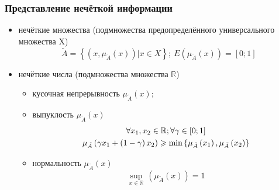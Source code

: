 \documentclass[12pt]{beamer}
\begin{document}

\begin{frame}
  \frametitle{Представление нечёткой информации}
  \begin{itemize}
    \item нечёткие множества (подмножества предопределённого универсального множества X)
      \begin{equation}
      	\tilde{A}=\left\{ \left( x, \mu_{\tilde A}\left( x \right) \right)\left| x\in X \right. \right\};\ E \left( \mu_{\tilde A} \left( x \right) \right) = \left[0; 1 \right]
      \end{equation}      
    \item нечёткие числа (подмножества множества $\mathbb{R}$)
      \begin{itemize}
        \item кусочная непрерывность $\mu_{\tilde A}\left( x \right)$;
        \item выпуклость $\mu_{\tilde A}\left( x \right)$
      	\begin{gather}
      	  \forall x_1, x_2 \in \mathbb{R}; \forall \gamma \in \left[ 0;1 \right] \notag \\
      	  \mu_{\tilde A}\left( \gamma x_1+\left( 1-\gamma  \right)x_2 \right)\geqslant \min \left\{ \mu_{\tilde A}\left( x_1 \right),\mu_{\tilde A}\left( x_2 \right) \right\}
      	\end{gather}
      	\item нормальность $\mu_{\tilde A}\left( x \right)$
        	\begin{equation}
        		\underset{x\in \mathbb{R}}{\mathop {\sup}}{}\, \left( \mu_{\tilde A} \left( x \right) \right)=1
        	\end{equation}
      \end{itemize}
  \end{itemize}
\end{frame}

\end{document}
